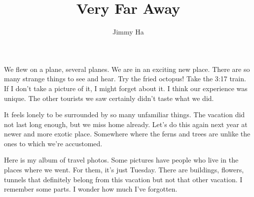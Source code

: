 \documentclass[14pt, letterpaper]{extarticle}
\begin{document}
 \title{\LARGE{Very Far Away}}
 \author{\normalsize{Jimmy Ha}}
 \date{}
  
\maketitle

We flew on a plane, several planes. We are in an exciting new place. There are so many strange things to see and hear. Try the fried octopus! Take the 3:17 train.  If I don't take a picture of it, I might forget about it. I think our experience was unique. The other tourists we saw certainly didn't taste what we did. 

\vspace{1\baselineskip}
It feels lonely to be surrounded by so many unfamiliar things. The vacation did not last long enough, but we miss home already. Let's do this again next year at newer and more exotic place. Somewhere where the ferns and trees are unlike the ones to which we're accustomed.

\vspace{1\baselineskip}
Here is my album of travel photos. Some pictures have people who live in the places where we went. For them, it's just Tuesday.  There are  buildings, flowers, tunnels that definitely belong from this vacation but not that other vacation. I remember some parts. I wonder how much I've forgotten. 




  
  
\end{document}
